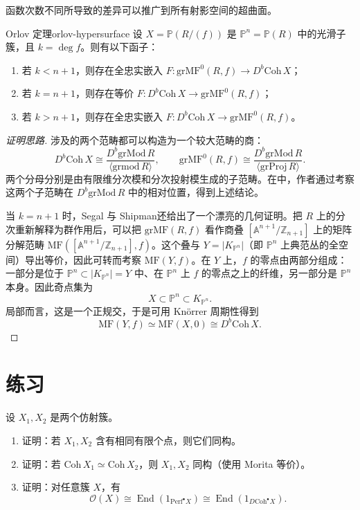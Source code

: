 函数次数不同所导致的差异可以推广到所有射影空间的超曲面。

\begin{theorem}{Orlov 定理}{orlov-hypersurface}
设 $X=\mathbb P(R/(f))$ 是 $\mathbb P^n=\mathbb P(R)$ 中的光滑子簇，且 $k=\deg f$。则有以下函子：
\begin{enumerate}[label=(\roman*)]
  \item 若 $k<n+1$，则存在全忠实嵌入 $F\colon\mathrm{grMF}^{0}(R,f)\to D^b\mathrm{Coh}\,X$；
  \item 若 $k=n+1$，则存在等价 $F\colon D^b\mathrm{Coh}\,X\to\mathrm{grMF}^{0}(R,f)$；
  \item 若 $k>n+1$，则存在全忠实嵌入 $F\colon D^b\mathrm{Coh}\,X\to\mathrm{grMF}^{0}(R,f)$。
\end{enumerate}
\end{theorem}
\begin{proof}[证明思路]
涉及的两个范畴都可以构造为一个较大范畴的商：
\[
  D^b\mathrm{Coh}\,X\cong
  \frac{D^b\mathrm{grMod}\,R}{\langle\mathrm{grmod}\,R\rangle},
  \qquad
  \mathrm{grMF}^{0}(R,f)\cong
  \frac{D^b\mathrm{grMod}\,R}{\langle\mathrm{grProj}\,R\rangle}.
\]
两个分母分别是由有限维分次模和分次投射模生成的子范畴。在中，作者通过考察这两个子范畴在 $D^b\mathrm{grMod}\,R$ 中的相对位置，得到上述结论。

当 $k=n+1$ 时，Segal 与 Shipman还给出了一个漂亮的几何证明。把 $R$ 上的分次重新解释为群作用后，可以把 $\mathrm{grMF}(R,f)$ 看作商叠 $[\mathbb A^{n+1}/\mathbb Z_{n+1}]$ 上的矩阵分解范畴 $\mathrm{MF}([\mathbb A^{n+1}/\mathbb Z_{n+1}],f)$。这个叠与 $Y=|K_{\mathbb P^n}|$（即 $\mathbb P^n$ 上典范丛的全空间）导出等价，因此可转而考察 $\mathrm{MF}(Y,f)$。在 $Y$ 上，$f$ 的零点由两部分组成：一部分是位于 $\mathbb P^n\subset |K_{\mathbb P^n}|=Y$ 中、在 $\mathbb P^n$ 上 $f$ 的零点之上的纤维，另一部分是 $\mathbb P^n$ 本身。因此奇点集为
\[
  X\subset\mathbb P^n\subset K_{\mathbb P^n}.
\]
局部而言，这是一个正规交，于是可用 Knörrer 周期性得到
\[
  \mathrm{MF}(Y,f)\simeq\mathrm{MF}(X,0)\cong D^b\mathrm{Coh}\,X.
\]
\end{proof}

\section{练习}\label{sec:exercises-chapter-seven}

\begin{exercise}\label{exer:varieties-same-finite-points}
设 $X_1,X_2$ 是两个仿射簇。
\begin{enumerate}[label=(\roman*)]
  \item 证明：若 $X_1,X_2$ 含有相同有限个点，则它们同构。
  \item 证明：若 $\mathrm{Coh}\,X_1\simeq\mathrm{Coh}\,X_2$，则 $X_1,X_2$ 同构（使用 Morita 等价）。
  \item 证明：对任意簇 $X$，有
  \[
    \mathcal O(X)\cong\operatorname{End}(1_{\mathrm{Perf}^{\bullet}X})
    \cong\operatorname{End}(1_{D\mathrm{Coh}^{\bullet}X}).
  \]
\end{enumerate}
\end{exercise}

